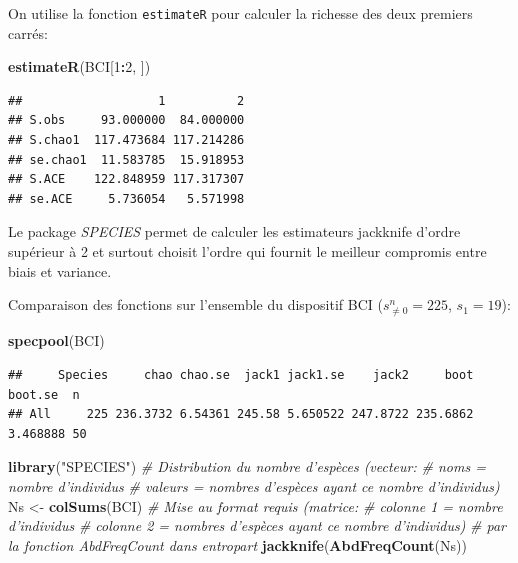 \documentclass[
  11pt,
  french,
  a4paper,
  extrafontsizes,onecolumn,openright
  ]{memoir}
\newenvironment{Shaded}{\begin{snugshade}}{\end{snugshade}}
\newcommand{\CommentTok}[1]{\textcolor[rgb]{0.56,0.35,0.01}{\textit{#1}}}
\newcommand{\DecValTok}[1]{\textcolor[rgb]{0.00,0.00,0.81}{#1}}
\newcommand{\KeywordTok}[1]{\textcolor[rgb]{0.13,0.29,0.53}{\textbf{#1}}}
\newcommand{\NormalTok}[1]{#1}
\newcommand{\OperatorTok}[1]{\textcolor[rgb]{0.81,0.36,0.00}{\textbf{#1}}}
\newcommand{\StringTok}[1]{\textcolor[rgb]{0.31,0.60,0.02}{#1}}
\begin{document}
\normalsize

On utilise la fonction \texttt{estimateR} pour calculer la richesse des deux premiers carrés:

\scriptsize

\begin{Shaded}
\begin{Highlighting}[]
\KeywordTok{estimateR}\NormalTok{(BCI[}\DecValTok{1}\OperatorTok{:}\DecValTok{2}\NormalTok{, ])}
\end{Highlighting}
\end{Shaded}

\begin{verbatim}
##                   1          2
## S.obs     93.000000  84.000000
## S.chao1  117.473684 117.214286
## se.chao1  11.583785  15.918953
## S.ACE    122.848959 117.317307
## se.ACE     5.736054   5.571998
\end{verbatim}

\normalsize

Le package \emph{SPECIES} \autocite{Wang2011} permet de calculer les estimateurs jackknife d'ordre supérieur à 2 et surtout choisit l'ordre qui fournit le meilleur compromis entre biais et variance.

Comparaison des fonctions sur l'ensemble du dispositif BCI (\(s^{n}_{\ne 0}=225\), \(s_{1}=19\)):

\scriptsize

\begin{Shaded}
\begin{Highlighting}[]
\KeywordTok{specpool}\NormalTok{(BCI)}
\end{Highlighting}
\end{Shaded}

\begin{verbatim}
##     Species     chao chao.se  jack1 jack1.se    jack2     boot  boot.se  n
## All     225 236.3732 6.54361 245.58 5.650522 247.8722 235.6862 3.468888 50
\end{verbatim}

\begin{Shaded}
\begin{Highlighting}[]
\KeywordTok{library}\NormalTok{(}\StringTok{"SPECIES"}\NormalTok{)}
\CommentTok{# Distribution du nombre d'espèces (vecteur: }
\CommentTok{# noms = nombre d'individus}
\CommentTok{# valeurs = nombres d'espèces ayant ce nombre d'individus)}
\NormalTok{Ns <-}\StringTok{ }\KeywordTok{colSums}\NormalTok{(BCI)}
\CommentTok{# Mise au format requis (matrice:}
\CommentTok{# colonne 1 = nombre d'individus}
\CommentTok{# colonne 2 = nombres d'espèces ayant ce nombre d'individus)}
\CommentTok{# par la fonction AbdFreqCount dans entropart}
\KeywordTok{jackknife}\NormalTok{(}\KeywordTok{AbdFreqCount}\NormalTok{(Ns))}
\end{Highlighting}
\end{Shaded}
\end{document}
